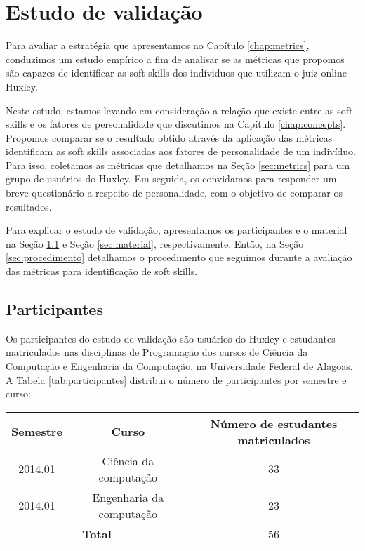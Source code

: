 

\chapter{Estudo de validação}

\label{chap:evaluation}

Para avaliar a estratégia que apresentamos no Capítulo \ref{chap:metrics}, conduzimos um estudo empírico a fim de analisar se as métricas que propomos são capazes de identificar as soft skills dos indíviduos que utilizam o juiz online Huxley.

Neste estudo, estamos levando em consideração a relação que existe entre as soft skills e os fatores de personalidade que discutimos na Capítulo \ref{chap:concepts}. Propomos comparar se o resultado obtido através da aplicação das métricas identificam as soft skills associadas aos fatores de personalidade de um indivíduo. Para isso, coletamos as métricas que detalhamos na Seção \ref{sec:metrics} para um grupo de usuários do Huxley. Em seguida, os convidamos para responder um breve questionário a respeito de personalidade, com o objetivo de comparar os resultados. 

Para explicar o estudo de validação, apresentamos os participantes e o material na Seção \ref{sec:participantes} e Seção \ref{sec:material}, respectivamente. Então, na Seção \ref{sec:procedimento} detalhamos o procedimento que seguimos durante a avaliação das métricas para identificação de soft skills.

\section{Participantes}
\label{sec:participantes}

Os participantes do estudo de validação são usuários do Huxley e estudantes matriculados nas disciplinas de Programação dos cursos de Ciência da Computação e Engenharia da Computação, na Universidade Federal de Alagoas. A Tabela \ref{tab:participantes} distribui o número de participantes por semestre e curso:

\begin{table*}[h]
\footnotesize
\caption{\small Participantes}
\addtolength{\tabcolsep}{-3.5pt}
\renewcommand{\arraystretch}{1.7} 
\centering

\begin{tabular}{|c|c|c|}
\hline
\textbf{Semestre} & \textbf{Curso} 		& 	\textbf{Número de estudantes matriculados} \\ \hline
2014.01 & Ciência da computação 	 		& 	33 		\\ \hline
2014.01 & Engenharia da computação 		& 	23 		\\ \hline
\multicolumn{2}{|c|}{\textbf{Total}} 	&		56 		\\ \hline
\end{tabular}

\label{tab:participantes}
\end{table*}

